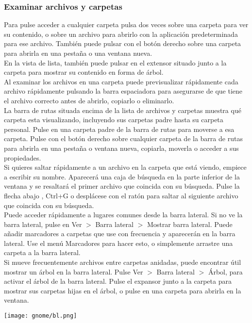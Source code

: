 \subsubsection{Examinar archivos y carpetas}
Para pulse acceder a cualquier carpeta pulsa dos veces sobre una carpeta para ver su contenido, o sobre un archivo para abrirlo con la aplicación predeterminada para ese archivo. También puede pulsar con el botón derecho sobre una carpeta para abrirla en una pestaña o una ventana nueva.\\ 
En la vista de lista, también puede pulsar en el extensor situado junto a la carpeta para mostrar su contenido en forma de árbol.\\
Al examinar los archivos en una carpeta puede previsualizar rápidamente cada archivo rápidamente pulsando la barra espaciadora para asegurarse de que tiene el archivo correcto antes de abrirlo, copiarlo o eliminarlo.\\
La barra de rutas situada encima de la lista de archivos y carpetas muestra qué carpeta esta visualizando, incluyendo sus carpetas padre hasta su carpeta personal. Pulse en una carpeta padre de la barra de rutas para moverse a esa carpeta. Pulse con el botón derecho sobre cualquier carpeta de la barra de rutas para abrirla en una pestaña o ventana nueva, copiarla, moverla o acceder a sus propiedades.\\
Si quieres saltar rápidamente a un archivo en la carpeta que está viendo, empiece a escribir su nombre. Aparecerá una caja de búsqueda en la parte inferior de la ventana y se resaltará el primer archivo que coincida con su búsqueda. Pulse la flecha abajo , Ctrl+G o desplácese con el ratón para saltar al siguiente archivo que coincida con su búsqueda.\\
Puede acceder rápidamente a lugares comunes desde la barra lateral. Si no ve la barra lateral, pulse en Ver $>$ Barra lateral $>$ Mostrar barra lateral. Puede añadir marcadores a carpetas que use con frecuencia y aparecerán en la barra lateral. Use el menú Marcadores para hacer esto, o simplemente arrastre una carpeta a la barra lateral.\\
Si mueve frecuentemente archivos entre carpetas anidadas, puede encontrar útil mostrar un árbol en la barra lateral. Pulse Ver $>$ Barra lateral $>$ Árbol, para activar el árbol de la barra lateral. Pulse el expansor junto a la carpeta para mostrar sus carpetas hijas en el árbol, o pulse en una carpeta para abrirla en la ventana.
\begin{center}
\texttt{[image: gnome/bl.png]}
\end{center}

